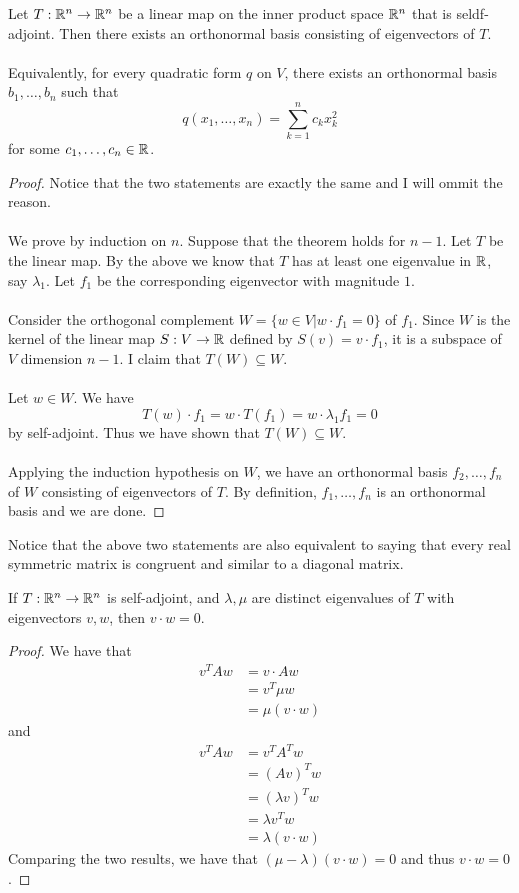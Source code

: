 \documentclass[a4paper]{article}
\begin{document}
\begin{thm}{}{} Let $T:\mathbb{R}^n\to\mathbb{R}^n$ be a linear map on the inner product space $\mathbb{R}^n$ that is seldf-adjoint. Then there exists an orthonormal basis consisting of eigenvectors of $T$. \\~\\
Equivalently, for every quadratic form $q$ on $V$, there exists an orthonormal basis $b_1,\dots,b_n$ such that $$q(x_1,\dots,x_n)=\sum_{k=1}^nc_kx_k^2$$ for some $c_1,\dots,c_n\in\mathbb{R}$. \tcbline
\begin{proof}
Notice that the two statements are exactly the same and I will ommit the reason. \\~\\
We prove by induction on $n$. Suppose that the theorem holds for $n-1$. Let $T$ be the linear map. By the above we know that $T$ has at least one eigenvalue in $\mathbb{R}$, say $\lambda_1$. Let $f_1$ be the corresponding eigenvector with magnitude $1$. \\~\\
Consider the orthogonal complement $W=\{w\in V|w\cdot f_1=0\}$ of $f_1$. Since $W$ is the kernel of the linear map $S:V\to\mathbb{R}$ defined by $S(v)=v\cdot f_1$, it is a subspace of $V$ dimension $n-1$. I claim that $T(W)\subseteq W$. \\~\\
Let $w\in W$. We have $$T(w)\cdot f_1=w\cdot T(f_1)=w\cdot\lambda_1f_1=0$$ by self-adjoint. Thus we have shown that $T(W)\subseteq W$. \\~\\
Applying the induction hypothesis on $W$, we have an orthonormal basis $f_2,\dots,f_n$ of $W$ consisting of eigenvectors of $T$. By definition, $f_1,\dots,f_n$ is an orthonormal basis and we are done. 
\end{proof}
\end{thm}

Notice that the above two statements are also equivalent to saying that every real symmetric matrix is congruent and similar to a diagonal matrix. 

\begin{prp}{}{} If $T:\mathbb{R}^n\to\mathbb{R}^n$ is self-adjoint, and $\lambda,\mu$ are distinct eigenvalues of $T$ with eigenvectors $v,w$, then $v\cdot w=0$. \tcbline
\begin{proof}
We have that
\begin{align*}
v^TAw&=v\cdot Aw\\
&=v^T\mu w\\
&=\mu(v\cdot w)
\end{align*} and 
\begin{align*}
v^TAw&=v^TA^Tw\\
&=(Av)^Tw\\
&=(\lambda v)^Tw\\
&=\lambda v^Tw\\
&=\lambda(v\cdot w)
\end{align*}
Comparing the two results, we have that $(\mu-\lambda)(v\cdot w)=0$ and thus $v\cdot w=0$. 
\end{proof}
\end{prp}
\end{document}
